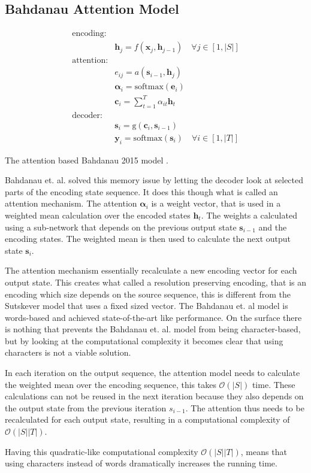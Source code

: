 \subsection{Bahdanau Attention Model}
\label{sec:theory:sequential:bahdanau}

\begin{equationbox}[H]
\begin{equation*}
\begin{aligned}
\text{encoding:} & \\
& \mathbf{h}_j = f(\mathbf{x}_j, \mathbf{h}_{j-1}) \quad \forall j \in [1, |S|] \\
\text{attention:} & \\
& e_{ij} = a(\mathbf{s}_{i-1}, \mathbf{h}_j) \\
& \bm{\alpha}_i = \mathrm{softmax}(\mathbf{e}_i) \\
& \mathbf{c}_i = {\textstyle \sum_{t=1}^T} \alpha_{it} \mathbf{h}_t \\
\text{decoder:} & \\
&\mathbf{s}_i = \mathrm{g}(\mathbf{c}_i, \mathbf{s}_{i-1}) \\
&\mathbf{y}_i = \mathrm{softmax}(\mathbf{s}_i) \quad \forall i \in [1, |T|]
\end{aligned}
\end{equation*}
\caption{The attention based Bahdanau 2015 model \cite{bahdanau-2015-nmt}.}
\end{equationbox}

Bahdanau et. al. solved this memory issue by letting the decoder look at selected parts of the encoding state sequence. It does this though what is called an attention mechanism. The attention $\bm{\alpha}_i$ is a weight vector, that is used in a weighted mean calculation over the encoded states $\mathbf{h}_t$. The weights a calculated using a sub-network that depends on the previous output state $\mathbf{s}_{i-1}$ and the encoding states. The weighted mean is then used to calculate the next output state $\mathbf{s}_{i}$.

The attention mechanism essentially recalculate a new encoding vector for each output state. This creates what called a resolution preserving encoding, that is an encoding which size depends on the source sequence, this is different from the Sutskever model that uses a fixed sized vector. The Bahdanau et. al model is words-based and achieved state-of-the-art like performance. On the surface there is nothing that prevents the Bahdanau et. al. model from being character-based, but by looking at the computational complexity it becomes clear that using characters is not a viable solution.

In each iteration on the output sequence, the attention model needs to calculate the weighted mean over the encoding sequence, this takes $\mathcal{O}(|S|)$ time. These calculations can not be reused in the next iteration because they also depends on the output state from the previous iteration $s_{i-1}$. The attention thus needs to be recalculated for each output state, resulting in a computational complexity of $\mathcal{O}(|S||T|)$.

Having this quadratic-like computational complexity $\mathcal{O}(|S||T|)$, means that using characters instead of words dramatically increases the running time.
